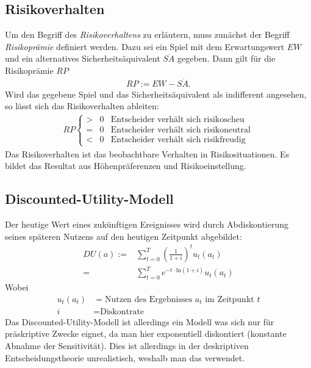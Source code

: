 \documentclass[12pt,a4paper]{scrartcl}
\begin{document}
\subsection{Risikoverhalten}
Um den Begriff des \textit{Risikoverhaltens} zu erläutern, muss zunächst der Begriff \textit{Risikoprämie} definiert werden. Dazu sei ein Spiel mit dem Erwartungswert $ EW $ und ein alternatives Sicherheitsäquivalent $ S\ddot{A} $ gegeben. Dann gilt für die Risikoprämie $ RP $
\begin{align*}
	RP := EW - S\ddot{A}.
\end{align*}
Wird das gegebene Spiel und das Sicherheitsäquivalent als indifferent angesehen, so lässt sich das Risikoverhalten ableiten:
\begin{align*}
	RP \left\lbrace \begin{array}{ccl}
	> & 0 & \text{Entscheider verhält sich risikoscheu}\\
	= & 0 & \text{Entscheider verhält sich risikoneutral}\\
	< & 0 & \text{Entscheider verhält sich risikfreudig}
	\end{array}\right.
\end{align*}
Das Risikoverhalten ist das beobachtbare Verhalten in Risikosituationen. Es bildet das Resultat aus Höhenpräferenzen und Risikoeinstellung.

\subsection{Discounted-Utility-Modell} \label{sec:du}
Der heutige Wert eines zukünftigen Ereignisses wird durch Abdiskontierung seines späteren Nutzens auf den heutigen Zeitpunkt abgebildet:
\begin{align*}
	DU(a) :=& \sum_{t=0}^{T} \left(\frac{1}{1+i}\right)^t u_t(a_t) \\
	=& \sum_{t=0}^{T} e^{-t\cdot \text{ln}(1+i)} u_t(a_t)
\end{align*}
Wobei
\begin{align*}
	u_t(a_t) &= \text{Nutzen des Ergebnisses } a_t \text{ im Zeitpunkt } t\\
	i &= \text{Diskontrate}
\end{align*}
Das Discounted-Utility-Modell ist allerdings ein Modell was sich nur für präskriptive Zwecke eignet, da man hier exponentiell diskontiert (konstante Abnahme der Sensitivität). Dies ist allerdings in der deskriptiven Entscheidungstheorie unrealistisch, weshalb man das  verwendet.
\end{document}
